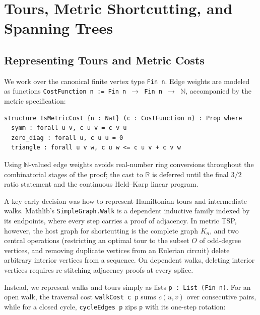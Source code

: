 \section{Tours, Metric Shortcutting, and Spanning Trees}
\label{sec:tours_mst}

\subsection{Representing Tours and Metric Costs}

We work over the canonical finite vertex type \texttt{Fin n}. Edge weights are modeled as functions \texttt{CostFunction n := Fin n $\to$ Fin n $\to$ $\mathbb{N}$}, accompanied by the metric specification:

\noindent\begin{minipage}{\linewidth}
\begin{lstlisting}[language=lean4]
structure IsMetricCost {n : Nat} (c : CostFunction n) : Prop where
  symm : forall u v, c u v = c v u
  zero_diag : forall u, c u u = 0
  triangle : forall u v w, c u w <= c u v + c v w
\end{lstlisting}
\end{minipage}
Using $\mathbb{N}$-valued edge weights avoids real-number ring conversions throughout the combinatorial stages of the proof; the cast to $\mathbb{R}$ is deferred until the final $3/2$ ratio statement and the continuous Held--Karp linear program.

A key early decision was how to represent Hamiltonian tours and intermediate walks. Mathlib's \texttt{SimpleGraph.Walk} is a dependent inductive family indexed by its endpoints, where every step carries a proof of adjacency. In metric TSP, however, the host graph for shortcutting is the complete graph $K_n$, and two central operations (restricting an optimal tour to the subset $O$ of odd-degree vertices, and removing duplicate vertices from an Eulerian circuit) delete arbitrary interior vertices from a sequence. On dependent walks, deleting interior vertices requires re-stitching adjacency proofs at every splice.

Instead, we represent walks and tours simply as lists \texttt{p : List (Fin n)}. For an open walk, the traversal cost \texttt{walkCost c p} sums $c(u,v)$ over consecutive pairs, while for a closed cycle, \texttt{cycleEdges p} zips \texttt{p} with its one-step rotation:

